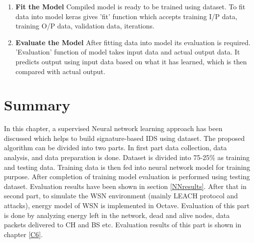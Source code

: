 \begin{enumerate}[label=\textbf{\roman*}]
\item \textbf{Fit the Model } Compiled model is ready to be trained using dataset. To fit data into model keras gives 'fit' function which accepts training I/P data, training O/P data, validation data, iterations.

\item \textbf{Evaluate the Model } After fitting data into model its evaluation is required. 'Evaluation' function of model takes input data and actual output data. It predicts output using input data based on what it has learned, which is then compared with actual output. 

\end{enumerate}    

        
\section{Summary} \label{SSummary}
In this chapter, a supervised Neural network learning approach has been discussed which helps to build signature-based IDS using dataset. The proposed algorithm can be divided into two parts. In first part data collection, data analysis, and data preparation is done. Dataset is divided into 75-25\% as training and testing data.  Training data is then fed into neural network model for training purpose. After completion of training model evaluation is performed using testing dataset. Evaluation results have been shown in section \ref{NNresults}.
After that in second part, to simulate the WSN environment (mainly LEACH protocol and attacks), energy model of WSN is implemented in Octave. Evaluation of this part is done by analyzing energy left in the network, dead and alive nodes, data packets delivered to CH and BS etc. Evaluation results of this part is shown in chapter \ref{C6}.
 